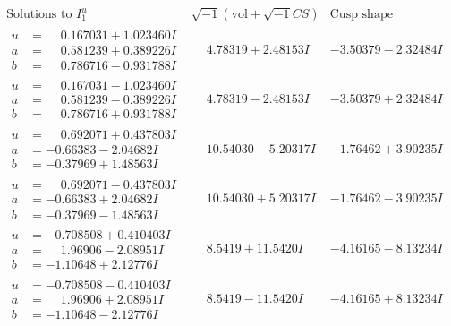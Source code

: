 \documentclass[1p]{elsarticle_modified}
\theoremstyle{definition}
\newcommand{\I}{\sqrt{-1}}
\begin{document}
$$\begin{array}{c|c|c}  
\text{Solutions to }I^u_{1}& \I (\text{vol} + \sqrt{-1}CS) & \text{Cusp shape}\\
 \hline 
\begin{aligned}
u &= \phantom{-}0.167031 + 1.023460 I \\
a &= \phantom{-}0.581239 + 0.389226 I \\
b &= \phantom{-}0.786716 - 0.931788 I\end{aligned}
 & \phantom{-}4.78319 + 2.48153 I & -3.50379 - 2.32484 I \\ \hline\begin{aligned}
u &= \phantom{-}0.167031 - 1.023460 I \\
a &= \phantom{-}0.581239 - 0.389226 I \\
b &= \phantom{-}0.786716 + 0.931788 I\end{aligned}
 & \phantom{-}4.78319 - 2.48153 I & -3.50379 + 2.32484 I \\ \hline\begin{aligned}
u &= \phantom{-}0.692071 + 0.437803 I \\
a &= -0.66383 - 2.04682 I \\
b &= -0.37969 + 1.48563 I\end{aligned}
 & \phantom{-}10.54030 - 5.20317 I & -1.76462 + 3.90235 I \\ \hline\begin{aligned}
u &= \phantom{-}0.692071 - 0.437803 I \\
a &= -0.66383 + 2.04682 I \\
b &= -0.37969 - 1.48563 I\end{aligned}
 & \phantom{-}10.54030 + 5.20317 I & -1.76462 - 3.90235 I \\ \hline\begin{aligned}
u &= -0.708508 + 0.410403 I \\
a &= \phantom{-}1.96906 - 2.08951 I \\
b &= -1.10648 + 2.12776 I\end{aligned}
 & \phantom{-}8.5419 + 11.5420 I & -4.16165 - 8.13234 I \\ \hline\begin{aligned}
u &= -0.708508 - 0.410403 I \\
a &= \phantom{-}1.96906 + 2.08951 I \\
b &= -1.10648 - 2.12776 I\end{aligned}
 & \phantom{-}8.5419 - 11.5420 I & -4.16165 + 8.13234 I \\ \hline\begin{aligned}

\end{aligned}
\end{array}$$
\end{document}
